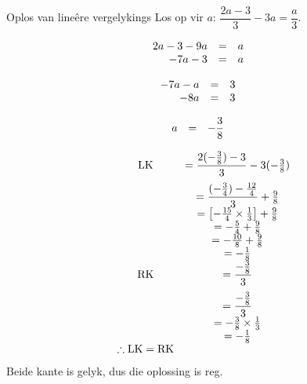 \begin{wex}
{Oplos van lineêre vergelykings}
{Los op vir $a$: $\dfrac{2a-3}{3}-3a=\dfrac{a}{3}$.}
{

\begin{equation*}
    \begin{array}{cccc}\hfill 2a-3 - 9a &= &a\hfill & \\ 
\hfill -7a - 3 &= &a\hfill & 
    \end{array}
\end{equation*}

\begin{equation*}
    \begin{array}{cccc}\hfill -7a -a &= &3\hfill & \\ 
\hfill -8a &= &3\hfill & \\
    \end{array}
\end{equation*}

\begin{equation*}
    \begin{array}{cccc}\hfill a &= & -\dfrac{3}{8}\hfill & \\ 

    \end{array}
\end{equation*}

\begin{equation*}
    \begin{array}{ccll}
 \mbox{LK} &= \dfrac{2(-\frac{3}{8}) - 3}{3} - 3(-\frac{3}{8}) \vspace{6pt}\\
  &=\dfrac{(-\frac{3}{4}) - \frac{12}{4}}{3} + \frac{9}{8}\\ 
  &=\left[-\frac{15}{4} \times \frac{1}{3}\right] + \frac{9}{8}\\ 
  &=-\frac{5}{4} + \frac{9}{8}\\ 
  &=-\frac{10}{8} + \frac{9}{8}\\ 
  &=-\frac{1}{8} \\

 \mbox{RK} &= \dfrac{-\frac{3}{8}}{3}\vspace{6pt} \\
  &= \dfrac{-\frac{3}{8}}{3} \\ 
  &= -\frac{3}{8} \times \frac{1}{3} \\ 
  &= -\frac{1}{8} \\ 

\therefore \mbox{LK} = \mbox{RK}
\end{array}
\end{equation*}
Beide kante is gelyk, dus die oplossing is reg.
}
\end{wex}



